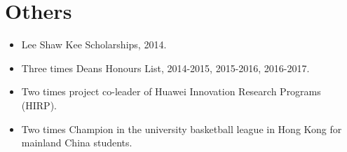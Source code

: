 \documentclass[a4paper,8pt]{article} %
\begin{document}

\section{Others}
\begin{itemize}
\item Lee Shaw Kee Scholarships, 2014.
\item Three times Deans Honours List, 2014-2015, 2015-2016, 2016-2017. 
\item Two times project co-leader of Huawei Innovation Research Programs (HIRP).
\item Two times Champion in the university basketball league in Hong Kong for mainland China students.
\end{itemize}










\end{document}
